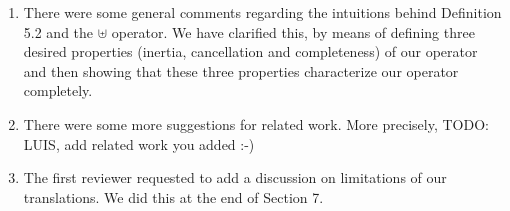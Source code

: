\documentclass{article}
\begin{document}
\begin{enumerate}
\begin{itemize}
\end{itemize}
\item There were some general comments regarding the intuitions behind Definition 5.2 and the $\uplus$ operator. We have clarified this, by means of defining three desired properties (inertia, cancellation and completeness) of our operator and then showing that these three properties characterize our operator completely. 
\item There were some more suggestions for related work. More precisely,  TODO: LUIS, add related work you added :-)
\item The first reviewer requested to add a discussion on limitations of our translations. We did this at the end of Section 7. 
	  \end{enumerate}
% 



\end{document}
